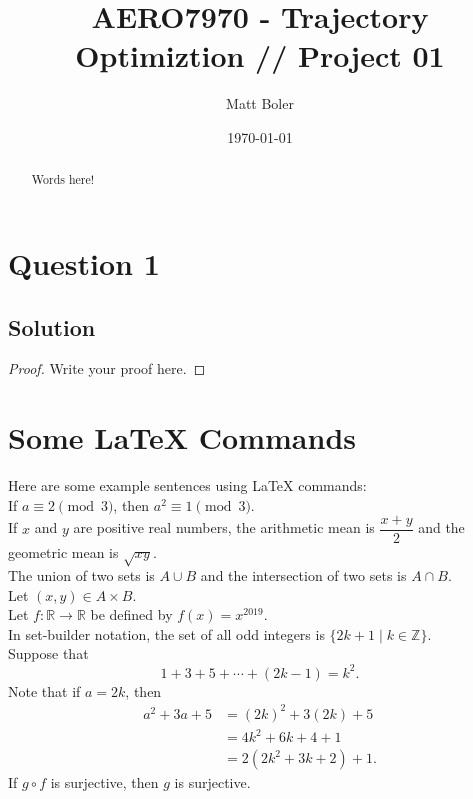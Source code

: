 \documentclass{article}
\title{AERO7970 - Trajectory Optimiztion // {\small Project 01}}
\author{Matt Boler}
\date{\today}
\begin{document}
\maketitle

\begin{abstract}
  Words here!
\end{abstract}

\section{Question 1}

\subsection*{Solution}
\begin{proof}
  Write your proof here.
\end{proof}

\section*{Some LaTeX Commands}

Here are some example sentences using LaTeX commands:\\
If $a\equiv 2\pmod{3}$, then $a^2\equiv 1\pmod 3$.\\
If $x$ and $y$ are positive real numbers, the arithmetic mean is $\dfrac{x+y}{2}$ and the geometric mean is $\sqrt{xy}$.\\
The union of two sets is $A\cup B$ and the intersection of two sets is $A\cap B$.\\
Let $(x,y)\in A\times B$.\\
Let $f:\mathbb{R}\to\mathbb{R}$ be defined by $f(x)=x^{2019}$.\\
In set-builder notation,  the set of all odd integers is $\{2k+1\mid k\in\mathbb{Z}\}$.\\
Suppose that
\[1+3+5+\cdots+(2k-1) = k^2.\]
Note that if $a=2k$, then
\begin{align*}
    a^2+3a+5 &= (2k)^2+3(2k)+5 \\
             &= 4k^2+6k+4+1 \\
             &= 2(2k^2+3k+2)+1.
\end{align*}
If $g\circ f$ is surjective, then $g$ is surjective.\\
\end{document}
